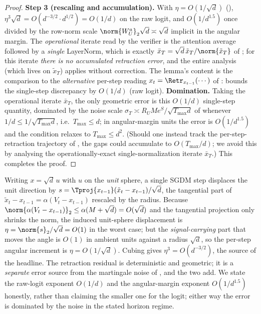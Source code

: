 \begin{proof}
\smallskip\noindent\textbf{Step 3 (rescaling and accumulation).} With
$\eta=O(1/\sqrt d)$ (),
$\eta^3\sqrt d=O(d^{-3/2}\cdot d^{1/2})=O(1/d)$ on the raw logit, and
$O(1/d^{1.5})$ once divided by the row-norm scale
$\norm{W_U^a}_2\sqrt d\asymp\sqrt d$ implicit in the angular margin. The
\emph{operational} iterate read by the verifier is the attention average
followed by a \emph{single} LayerNorm, which is exactly
$\bar x_T=\sqrt d\,\tilde x_T/\norm{\tilde x_T}$ of
; for this iterate \emph{there is no accumulated
retraction error}, and the entire analysis (which lives on $\tilde x_T$)
applies without correction. The lemma's content is the comparison to the
\emph{alternative} per-step reading $x_t=\Retr_{x_{t-1}}(\cdots)$ of
:  bounds the single-step
discrepancy by $O(1/d)$ (raw logit). \textbf{Domination.} Taking the
operational iterate $\bar x_T$, the only geometric error is this $O(1/d)$
single-step quantity, dominated by the noise scale
$\sigma_T\asymp R_U M e^S/\sqrt{T_{\max}d}$ of 
whenever $1/d\le1/\sqrt{T_{\max}d}$, i.e.\ $T_{\max}\le d$; in
angular-margin units the error is $O(1/d^{1.5})$ and the condition relaxes
to $T_{\max}\le d^2$. (Should one instead track the per-step-retraction
trajectory of , the gaps could accumulate to $O(T_{\max}/d)$;
we avoid this by analysing the operationally-exact single-normalization
iterate $\bar x_T$.) This completes the proof.
\end{proof}

\begin{remark}[The radius-$\sqrt d$ rescaling: why $\eta=O(1/\sqrt d)$]
\label{rem:retraction_rescaling}
Writing $x=\sqrt d\,u$ with $u$ on the \emph{unit} sphere, a single
SGDM step displaces the unit direction by $s=\Tproj{x_{t-1}}(\tilde x_t-x_{t-1})/\sqrt d$,
the tangential part of $\tilde x_t-x_{t-1}=\alpha(V_t-x_{t-1})$ rescaled by
the radius. Because $\norm{\alpha(V_t-x_{t-1})}_2\le\alpha(M+\sqrt d)=O(\sqrt d)$
and the tangential projection only shrinks the norm, the induced
unit-sphere displacement is $\eta=\norm{s}_2/\sqrt d=O(1)$ in the worst
case; but the \emph{signal-carrying} part that moves the angle is
$O(1)$ in ambient units against a radius $\sqrt d$, so the per-step angular
increment is $\eta=O(1/\sqrt d)$. Cubing gives $\eta^3=O(d^{-3/2})$, the
source of the headline. The retraction residual is deterministic and
geometric; it is a \emph{separate} error source from the martingale noise
of , and the two add. We state the raw-logit exponent
$O(1/d)$ and the angular-margin exponent $O(1/d^{1.5})$ honestly, rather
than claiming the smaller one for the logit; either way the error is
dominated by the noise in the stated horizon regime.
\end{remark}
